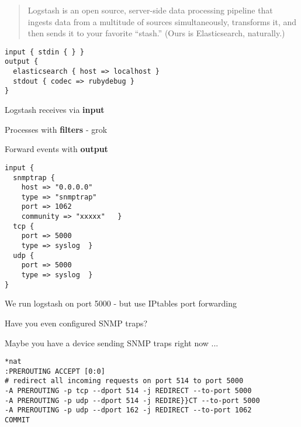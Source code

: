 \documentclass[Screen16to9,17pt]{foils}
\begin{document}

\begin{quote}
  Logstash is an open source, server-side data processing pipeline that ingests data from a multitude of sources simultaneously, transforms it, and then sends it to your favorite “stash.” (Ours is Elasticsearch, naturally.)\\
\end{quote}

\begin{verbatim}
input { stdin { } }
output {
  elasticsearch { host => localhost }
  stdout { codec => rubydebug }
}
\end{verbatim}



\begin{list2}
\item Logstash receives via {\bf input}
\item Processes with {\bf filters} - grok
\item Forward events with {\bf output}
\end{list2}



{\footnotesize
\begin{verbatim}
input {
  snmptrap {
    host => "0.0.0.0"
    type => "snmptrap"
    port => 1062
    community => "xxxxx"   }
  tcp {
    port => 5000
    type => syslog  }
  udp {
    port => 5000
    type => syslog  }
}
\end{verbatim}
}

\begin{list2}
\item We run logstash on port 5000 - but use IPtables port forwarding
\item Have you even configured SNMP traps?
\item Maybe you have a device sending SNMP traps right now ...
\end{list2}


{\footnotesize
\begin{verbatim}
*nat
:PREROUTING ACCEPT [0:0]
# redirect all incoming requests on port 514 to port 5000
-A PREROUTING -p tcp --dport 514 -j REDIRECT --to-port 5000
-A PREROUTING -p udp --dport 514 -j REDIRE}}CT --to-port 5000
-A PREROUTING -p udp --dport 162 -j REDIRECT --to-port 1062
COMMIT
\end{verbatim}
}
\end{document}
